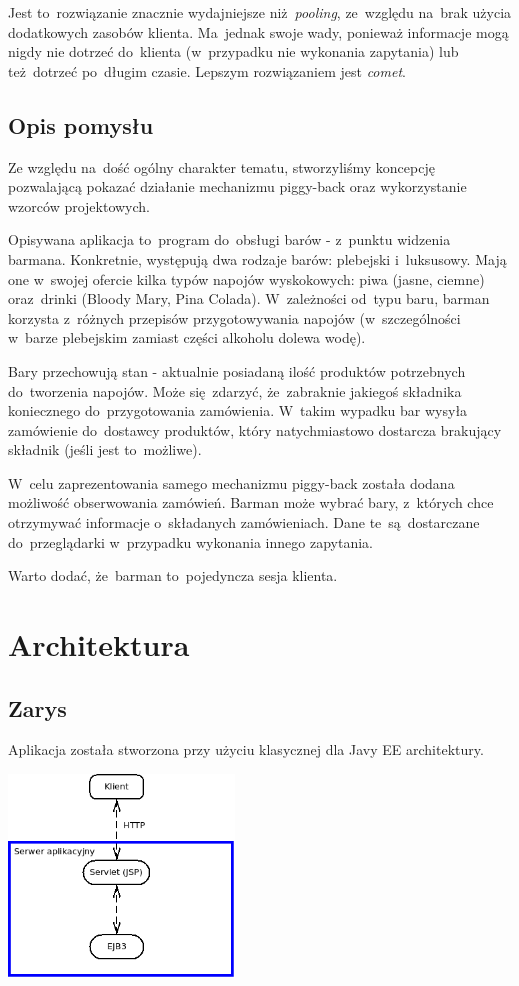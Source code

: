 \documentclass[11pt]{aghdpl}
\begin{document}
Jest to~rozwiązanie znacznie wydajniejsze niż~\textit{pooling}, ze~względu na~brak użycia dodatkowych zasobów klienta. Ma~jednak swoje wady, ponieważ informacje mogą nigdy nie dotrzeć do~klienta (w~przypadku nie wykonania zapytania) lub też~dotrzeć po~długim czasie. Lepszym rozwiązaniem jest \textit{comet}.

\section{Opis pomysłu}
Ze względu na~dość ogólny charakter tematu, stworzyliśmy koncepcję pozwalającą pokazać działanie mechanizmu piggy-back oraz wykorzystanie wzorców projektowych.

Opisywana aplikacja to~program do~obsługi barów - z~punktu widzenia barmana. Konkretnie, występują dwa rodzaje barów: plebejski i~luksusowy. Mają one w~swojej ofercie kilka typów napojów wyskokowych: piwa (jasne, ciemne) oraz~drinki (Bloody Mary, Pina Colada). W~zależności od~typu baru, barman korzysta z~różnych przepisów przygotowywania napojów (w~szczególności w~barze plebejskim zamiast części alkoholu dolewa wodę). 

Bary przechowują stan - aktualnie posiadaną ilość produktów potrzebnych do~tworzenia napojów. Może się~zdarzyć, że~zabraknie jakiegoś składnika koniecznego do~przygotowania zamówienia. W~takim wypadku bar wysyła zamówienie do~dostawcy produktów, który natychmiastowo dostarcza brakujący składnik (jeśli jest to~możliwe). 

W~celu zaprezentowania samego mechanizmu piggy-back została dodana możliwość obserwowania zamówień. Barman może wybrać bary, z~których chce otrzymywać informacje o~składanych zamówieniach. Dane te~są~dostarczane do~przeglądarki w~przypadku wykonania innego zapytania.

Warto dodać, że~barman to~pojedyncza sesja klienta.
\chapter{Architektura}
\section{Zarys}
Aplikacja została stworzona przy użyciu klasycznej dla Javy EE architektury.

\begin{center}
 \includegraphics[width=6cm]{arch}
\end{center}
\end{document}
